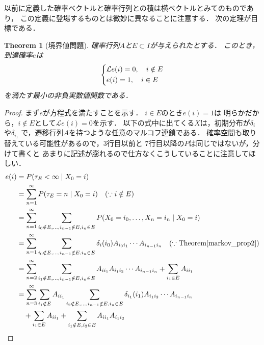 \documentclass[dvipdfmx,autodetect-engine]{jsarticle}
\newtheorem{theorem}{Theorem}[section]
\theoremstyle{remark}
\theoremstyle{definition}
\begin{document}
以前に定義した確率ベクトルと確率行列との積は横ベクトルとみてのものであり，
この定義に登場するものとは微妙に異なることに注意する．
次の定理が目標である．


\begin{theorem}[境界値問題]
    確率行列$A$と$E \subset I$が与えられたとする．
    このとき，到達確率$e$は
    \begin{align}
        \begin{dcases}
            \mathcal{L}e(i) = 0, \quad i \notin E \\
            e(i) = 1, \quad i \in E 
        \end{dcases}
    \end{align}
    を満たす最小の非負実数値関数である．
\end{theorem}

\begin{proof}
    まず$e$が方程式を満たすことを示す．
    $i \in E$のとき$e(i)=1$は
    明らかだから，$i \notin E$として$\mathcal{L}e(i)=0$を示す．
    以下の式中に出てくる$X$は，初期分布が$\delta_{i}$や$\delta_{i_1}$
    で，遷移行列$A$を持つような任意のマルコフ連鎖である．
    確率空間も取り替えている可能性があるので，3行目以前と
    7行目以降の$P$は同じではないが，分けて書くと
    あまりに記述が膨れるので仕方なくこうしていることに注意してほしい．
    \begin{align}
        e(i) &= P(\tau_{E}<\infty \mid X_0 = i) \\
        &= \sum_{n=1}^{\infty} P(\tau_{E} = n \mid X_0 = i) \quad (\because i \notin E)\\
        &= \sum_{n=1}^{\infty} \sum_{i_0 \notin E,\ldots,i_{n-1}\notin E,i_n\in E} 
        P(X_0 = i_0,\ldots,X_n = i_n \mid X_0 = i) \\
        &= \sum_{n=1}^{\infty} \sum_{i_0 \notin E,\ldots,i_{n-1}\notin E,i_n\in E} 
        \delta_{i}(i_0)  A_{i_0 i_1}\cdots A_{i_{n-1} i_n} \quad 
        (\because \mathrm{Theorem}\ref{markov_prop2})\\
        &= \sum_{n=2}^{\infty} \sum_{i_1 \notin E,\ldots,i_{n-1}\notin E,i_n\in E} 
         A_{i i_1} A_{i_1 i_2}\cdots A_{i_{n-1} i_n} 
         + \sum_{i_{1} \in E} A_{i i_{1}} \\
        &= \sum_{n=3}^{\infty} \sum_{i_{1} \notin E} A_{i i_{1}} 
        \sum_{i_2 \notin E,\ldots,i_{n-1}\notin E,i_n\in E} 
        \delta_{i_1}(i_1) A_{i_1 i_2}\cdots A_{i_{n-1} i_n} \\
        &\quad + \sum_{i_{1} \in E} A_{i i_{1}} 
        + \sum_{i_{1} \notin E,i_{2} \in E} A_{i i_{1}} A_{i_{1} i_{2}}\\

\end{align}
\end{proof}
\end{document}
